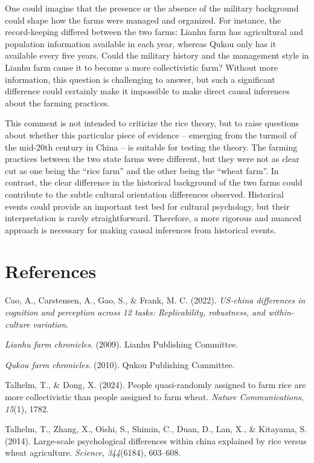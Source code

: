 \documentclass[
  man]{apa6}
\newlength{\cslhangindent}
\newlength{\cslentryspacingunit} %
\newenvironment{CSLReferences}[2] %
 {%
  \setlength{\parindent}{0pt}
  \ifodd #1
  \let\oldpar\par
  \def\par{\hangindent=\cslhangindent\oldpar}
  \fi
  \setlength{\parskip}{#2\cslentryspacingunit}
 }%
 {}
\begin{document}
One could imagine that the presence or the absence of the military background could shape how the farms were managed and organized. For instance, the record-keeping differed between the two farms: Lianhu farm has agricultural and population information available in each year, whereas Qukou only has it available every five years. Could the military history and the management style in Lianhu farm cause it to become a more collectivistic farm? Without more information, this question is challenging to answer, but such a significant difference could certainly make it impossible to make direct causal inferences about the farming practices.

This comment is not intended to criticize the rice theory, but to raise questions about whether this particular piece of evidence -- emerging from the turmoil of the mid-20th century in China -- is suitable for testing the theory. The farming practices between the two state farms were different, but they were not as clear cut as one being the ``rice farm'' and the other being the ``wheat farm''. In contrast, the clear difference in the historical background of the two farms could contribute to the subtle cultural orientation differences observed. Historical events could provide an important test bed for cultural psychology, but their interpretation is rarely straightforward. Therefore, a more rigorous and nuanced approach is necessary for making causal inferences from historical events.

\newpage

\hypertarget{references}{%
\section{References}\label{references}}

\hypertarget{refs}{}
\begin{CSLReferences}{1}{0}
\leavevmode{}%
Cao, A., Carstensen, A., Gao, S., \& Frank, M. C. (2022). \emph{US-china differences in cognition and perception across 12 tasks: Replicability, robustness, and within-culture variation}.

\leavevmode{}%
\emph{Lianhu farm chronicles}. (2009). Lianhu Publishing Committee.

\leavevmode{}%
\emph{Qukou farm chronicles}. (2010). Qukou Publishing Committee.

\leavevmode{}%
Talhelm, T., \& Dong, X. (2024). People quasi-randomly assigned to farm rice are more collectivistic than people assigned to farm wheat. \emph{Nature Communications}, \emph{15}(1), 1782.

\leavevmode{}%
Talhelm, T., Zhang, X., Oishi, S., Shimin, C., Duan, D., Lan, X., \& Kitayama, S. (2014). Large-scale psychological differences within china explained by rice versus wheat agriculture. \emph{Science}, \emph{344}(6184), 603--608.

\end{CSLReferences}
\end{document}
